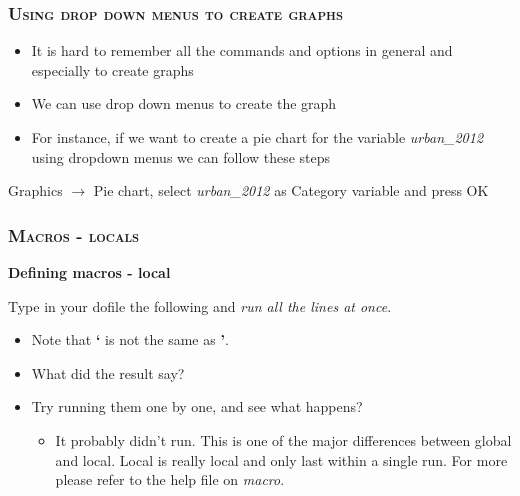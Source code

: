 \documentclass[10pt]{beamer}
\begin{document}
	
	\begin{frame}
		\frametitle{\textsc{Using drop down menus to create graphs}}
		
		\begin{itemize}
			\item It is hard to remember all the commands and options in general and especially to create graphs
			\item We can use drop down menus to create the graph
			\item For instance, if we want to create a pie chart for the variable \textit{urban\_2012} using dropdown menus we can follow these steps
			\end{itemize}
			Graphics $\rightarrow$ Pie chart, select \textit{urban\_2012} as Category variable and press OK
		
	\end{frame}
	
	

	\begin{frame}
	\frametitle{\textsc{Macros - locals}}
		\begin{center}
			 \LARGE \textbf{Defining macros - local}
		\end{center}
		Type in your dofile the following and \textit{run all the lines at once}.
		\begin{itemize}
			\item Note that \textbf{`} is not the same as \textbf{'}.
\begin{stlog}\end{stlog}
		\vspace{2mm}
		 \item What did the result say?
		\onslide<3-> 
\begin{stlog}\end{stlog}
			 \item Try running them one by one, and see what happens?
				\begin{itemize}
					 \item It probably didn't run. 
									   This is one of the major differences between global and local.
									   Local is really local and only last within a single run.
									   For more please refer to the help file on \textit{macro}.
				\end{itemize}
		\end{itemize}
	\end{frame} 
	
\end{document}
